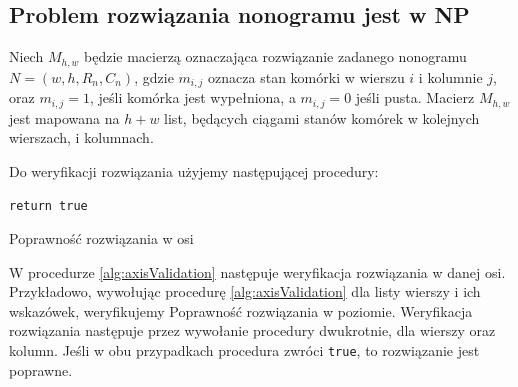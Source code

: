 \subsection{Problem rozwiązania nonogramu jest w NP}
    Niech $M_{h, w}$ będzie macierzą oznaczająca rozwiązanie zadanego nonogramu $N = (w, h, R_n, C_n)$,
gdzie $m_{i, j}$ oznacza stan komórki w wierszu $i$ i kolumnie $j$, oraz $m_{i, j} = 1$, jeśli komórka
jest wypełniona, a $m_{i, j} = 0$ jeśli pusta. Macierz $M_{h, w}$ jest mapowana na $h + w$ list,
będących ciągami stanów komórek w kolejnych wierszach, i kolumnach.

    Do weryfikacji rozwiązania użyjemy następującej procedury:

\begin{pseudokod}[H]
    \texttt{return true}\;
    \caption{Poprawność rozwiązania w osi}\label{alg:axisValidation}
\end{pseudokod}

    W procedurze \ref{alg:axisValidation} następuje weryfikacja rozwiązania w danej osi. Przykładowo,
wywołując procedurę \ref{alg:axisValidation} dla listy wierszy i ich wskazówek, weryfikujemy Poprawność
rozwiązania w poziomie. Weryfikacja rozwiązania następuje przez wywołanie procedury dwukrotnie,
dla wierszy oraz kolumn. Jeśli w obu przypadkach procedura zwróci \texttt{true}, to rozwiązanie jest poprawne.

